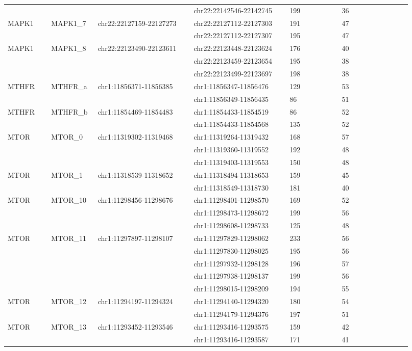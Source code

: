 \begin{landscape}
\begin{longtable}{p{0.1\linewidth}|p{0.1\linewidth}p{0.22\linewidth}p{0.22\linewidth}p{0.12\linewidth}p{0.16\linewidth}}
 & & & chr22:22142546-22142745 & 199 & 36
\\
MAPK1 & MAPK1\_7 & chr22:22127159-22127273 & chr22:22127112-22127303 & 191 & 47
\\
 & & & chr22:22127112-22127307 & 195 & 47
\\
MAPK1 & MAPK1\_8 & chr22:22123490-22123611 & chr22:22123448-22123624 & 176 & 40
\\
 & & & chr22:22123459-22123654 & 195 & 38
\\
 & & & chr22:22123499-22123697 & 198 & 38
\\
\hline
MTHFR & MTHFR\_a & chr1:11856371-11856385 & chr1:11856347-11856476 & 129 & 53
\\
 & & & chr1:11856349-11856435 & 86 & 51
\\
MTHFR & MTHFR\_b & chr1:11854469-11854483 & chr1:11854433-11854519 & 86 & 52
\\
 & & & chr1:11854433-11854568 & 135 & 52
\\
\hline
MTOR & MTOR\_0 & chr1:11319302-11319468 & chr1:11319264-11319432 & 168 & 57
\\
 & & & chr1:11319360-11319552 & 192 & 48
\\
 & & & chr1:11319403-11319553 & 150 & 48
\\
MTOR & MTOR\_1 & chr1:11318539-11318652 & chr1:11318494-11318653 & 159 & 45
\\
 & & & chr1:11318549-11318730 & 181 & 40
\\
MTOR & MTOR\_10 & chr1:11298456-11298676 & chr1:11298401-11298570 & 169 & 52
\\
 & & & chr1:11298473-11298672 & 199 & 56
\\
 & & & chr1:11298608-11298733 & 125 & 48
\\
MTOR & MTOR\_11 & chr1:11297897-11298107 & chr1:11297829-11298062 & 233 & 56
\\
 & & & chr1:11297830-11298025 & 195 & 56
\\
 & & & chr1:11297932-11298128 & 196 & 57
\\
 & & & chr1:11297938-11298137 & 199 & 56
\\
 & & & chr1:11298015-11298209 & 194 & 55
\\
MTOR & MTOR\_12 & chr1:11294197-11294324 & chr1:11294140-11294320 & 180 & 54
\\
 & & & chr1:11294179-11294376 & 197 & 51
\\
MTOR & MTOR\_13 & chr1:11293452-11293546 & chr1:11293416-11293575 & 159 & 42
\\
 & & & chr1:11293416-11293587 & 171 & 41

\end{longtable}
\end{landscape}
